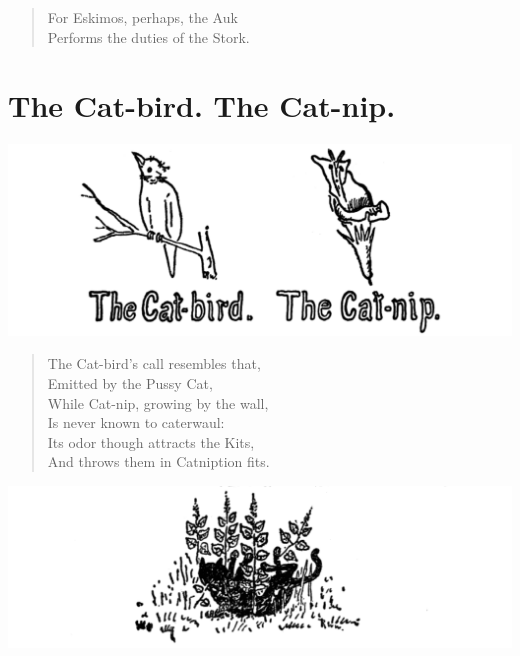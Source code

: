 \documentclass[letterpaper, 10pt, openany]{memoir}
\begin{document}
\begin{verse}\huge
For Eskimos, perhaps, the Auk\\
Performs the duties of the Stork.\\
\end{verse}

\chapter{The Cat-bird. The Cat-nip.}
\includegraphics[width=1\textwidth]{f-p20a.png}
\vspace{\onelineskip}
\begin{verse}\huge
The Cat-bird's call resembles that,\\
Emitted by the Pussy Cat,\\
While Cat-nip, growing by the wall,\\
Is never known to caterwaul:\\
Its odor though attracts the Kits,\\
And throws them in Catniption fits.\\
\end{verse}
\vspace{\onelineskip}
\includegraphics[width=1\textwidth]{f-p20b.png}
\end{document}
